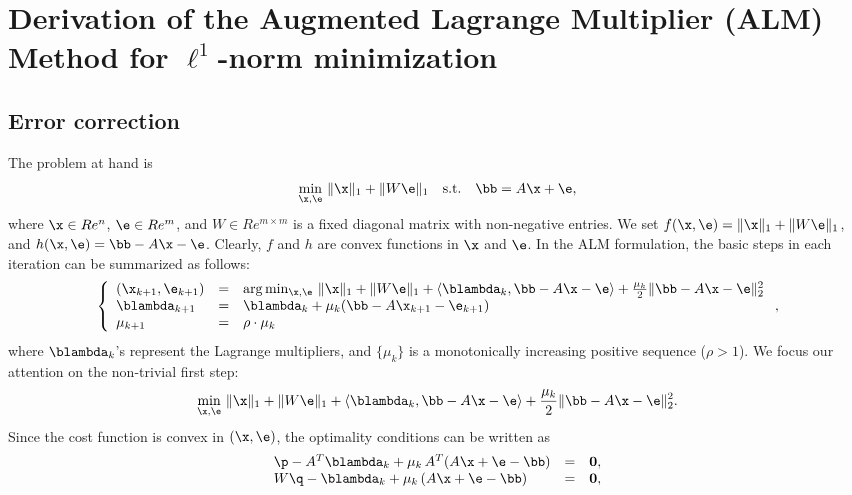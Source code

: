 \section{Derivation of the Augmented Lagrange Multiplier (ALM) Method for $\ell^1$-norm minimization}
\label{sec:alm_derivation}

\subsection{Error correction}

The problem at hand is 
\begin{equation}
\min_{\x,\e} \, \|\x\|_1 + \|W\e\|_1 \quad \mathrm{s.t.} \quad \bb = A\x + \e,
\end{equation}
where $\x \in Re^n$, $\e \in Re^m$, and $W \in Re^{m \times m}$ is a fixed diagonal matrix with non-negative entries. 
\smallbreak
We set $f(\x,\e) = \|\x\|_1 + \|W\e\|_1$, and $h(\x,\e) = \bb - A\x - \e$. Clearly, $f$ and $h$ are convex functions in $\x$ and $\e$. In the ALM formulation, the basic steps in each iteration can be summarized as follows:
\begin{equation}
\left \{ 
\begin{array}{lll}
(\x_{k+1},\e_{k+1}) & = & \arg\min_{\x,\e} \, \|\x\|_1 + \|W\e\|_1 + \langle \blambda_k, \bb - A\x - \e \rangle + \frac{\mu_k}{2}\|\bb - A\x - \e\|_2^2 \\
\blambda_{k+1} & = & \blambda_k + \mu_k (\bb - A\x_{k+1} - \e_{k+1}) \\
\mu_{k+1} & = & \rho\cdot\mu_k
\end{array} 
\right . ,
\end{equation}
where $\blambda_k$'s represent the Lagrange multipliers, and $\{\mu_k\}$ is a monotonically increasing positive sequence ($\rho > 1$).
\smallbreak
We focus our attention on the non-trivial first step:
\begin{equation}
\min_{\x,\e} \, \|\x\|_1 + \|W\e\|_1 + \langle \blambda_k, \bb - A\x - \e \rangle + \frac{\mu_k}{2}\|\bb - A\x - \e\|_2^2.
\label{eqn:alm}
\end{equation}
Since the cost function is convex in $(\x,\e)$, the optimality conditions can be written as
\begin{equation}
\begin{array}{lll}
\p - A^T\blambda_k + \mu_k\,A^T(A\x + \e - \bb) & = & \mathbf{0}, \\
W\q - \blambda_k + \mu_k\, (A\x + \e -\bb) & = & \mathbf{0},
\end{array}
\end{equation}
